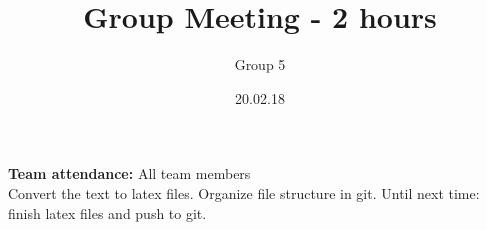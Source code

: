 \documentclass{article}
\title{Group Meeting - 2 hours}
\author{Group 5}
\date{20.02.18}
\begin{document}
	\maketitle
	\noindent
	\textbf{Team attendance:} All team members \\
	
	\noindent
	Convert the text to latex files. Organize file structure in git. 
	Until next time: finish latex files and push to git. 
\end{document}
